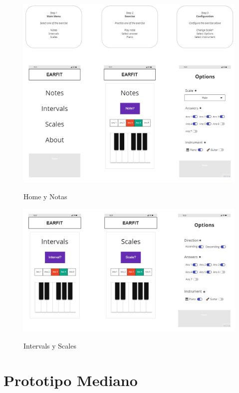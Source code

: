 \documentclass[12pt,twoside,titlepage]{report}
\begin{document}
{\begin{figure}[H]
    \centering
    \includegraphics[scale=0.35]{Design Thinking/Prototipo/Small/Prototipo}
    \label{fig:Prototipo1}
    \caption{Home y Notas}
\end{figure}

\begin{figure}[H]
    \centering
    \includegraphics[scale=0.3]{Design Thinking/Prototipo/Small/Prototipo2}
    \label{fig:Prototipo2}
    \caption{Intervals y Scales}
\end{figure}

\section{Prototipo Mediano}

}
\end{document}
